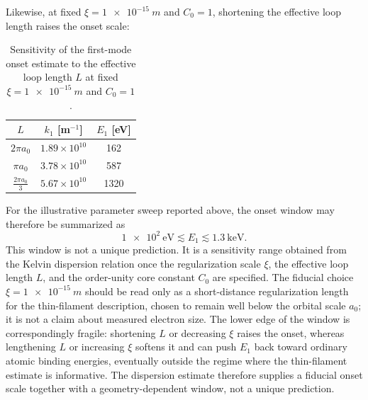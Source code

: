 \documentclass[pdflatex,sn-mathphys-num]{sn-jnl}
\begin{document}
        Likewise, at fixed $\xi=\SI{1e-15}{m}$ and $C_0=1$, shortening the effective loop length raises the onset scale:
        \begin{table}[htbp]
            \centering
            \caption{Sensitivity of the first-mode onset estimate to the effective loop length $L$ at fixed $\xi=\SI{1e-15}{m}$ and $C_0=1$.}
            \begin{tabular}{ccc}
                \toprule
                $L$ & $k_1$ [m$^{-1}$] & $E_1$ [eV] \\
                \midrule
                $2\pi a_0$      & $1.89\times 10^{10}$ & 162  \\
                $\pi a_0$       & $3.78\times 10^{10}$ & 587  \\
                $\tfrac{2\pi a_0}{3}$ & $5.67\times 10^{10}$ & 1320 \\
                \bottomrule
            \end{tabular}
            \label{tab:L-sensitivity}
        \end{table}

        For the illustrative parameter sweep reported above, the onset window may therefore be summarized as
        \begin{equation}
            \SI{1e2}{\electronvolt} \lesssim E_1 \lesssim \SI{1.3}{\kilo\electronvolt}.
        \end{equation}
        This window is not a unique prediction. It is a sensitivity range obtained from the Kelvin dispersion relation once the regularization scale $\xi$, the effective loop length $L$, and the order-unity core constant $C_0$ are specified. The fiducial choice $\xi=\SI{1e-15}{m}$ should be read only as a short-distance regularization length for the thin-filament description, chosen to remain well below the orbital scale $a_0$; it is not a claim about measured electron size. The lower edge of the window is correspondingly fragile: shortening $L$ or decreasing $\xi$ raises the onset, whereas lengthening $L$ or increasing $\xi$ softens it and can push $E_1$ back toward ordinary atomic binding energies, eventually outside the regime where the thin-filament estimate is informative. The dispersion estimate therefore supplies a fiducial onset scale together with a geometry-dependent window, not a unique prediction.

        \backmatter
\end{document}
